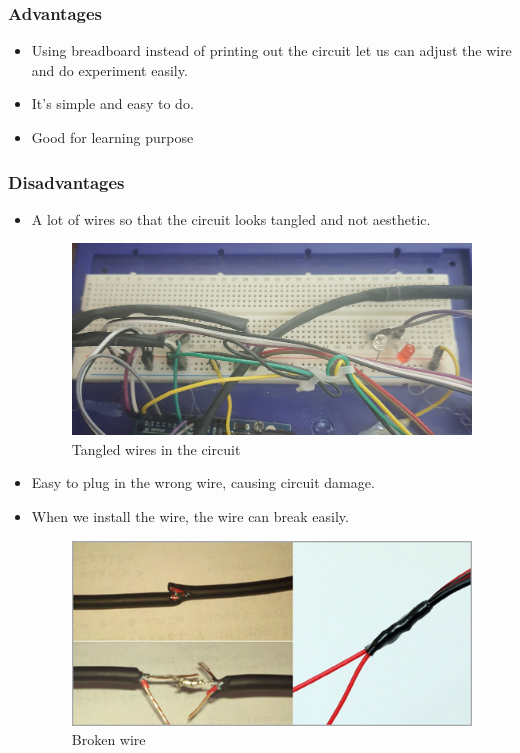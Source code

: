 \documentclass[12pt]{article}
\begin{document}
        \subsubsection{Advantages}
            \begin{itemize}
                \item Using breadboard instead of printing out the circuit let us can adjust the wire and do experiment easily.
                \item It's simple and easy to do.
                \item Good for learning purpose
            \end{itemize}
        \subsubsection{Disadvantages}
            \begin{itemize}
                \item A lot of wires so that the circuit looks tangled and not aesthetic.
                    \begin{figure}[!h]
                           \centering
                            \includegraphics[width=14cm]{images/day_roi.jpg}
                            \caption{Tangled wires in the circuit}
                            \label{fig:schematic}
                    \end{figure}
                \item Easy to plug in the wrong wire, causing circuit damage.
                \item When we install the wire, the wire can break easily.
                    \begin{figure}[!h]
                           \centering
                            \includegraphics[width=14cm]{images/daydien.png}
                            \caption{Broken wire}
                            \label{fig:schematic}
                    \end{figure}
            \end{itemize}
\end{document}
